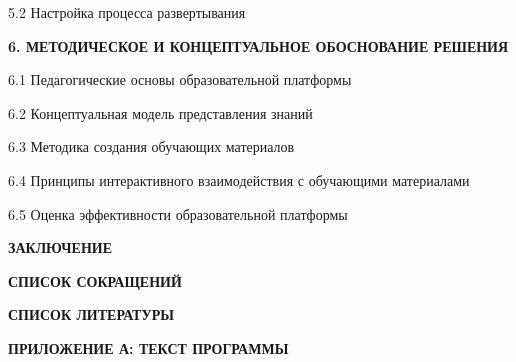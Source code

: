 {    \par 5.2 Настройка процесса развертывания 
    \par {\bfseries 6. МЕТОДИЧЕСКОЕ И КОНЦЕПТУАЛЬНОЕ ОБОСНОВАНИЕ РЕШЕНИЯ }
    \par 6.1 Педагогические основы образовательной платформы 
    \par 6.2 Концептуальная модель представления знаний 
    \par 6.3 Методика создания обучающих материалов 
    \par 6.4 Принципы интерактивного взаимодействия с обучающими материалами 
    \par 6.5 Оценка эффективности образовательной платформы 
    \par {\bfseries ЗАКЛЮЧЕНИЕ } 
    \par {\bfseries СПИСОК СОКРАЩЕНИЙ } 
    \par {\bfseries СПИСОК ЛИТЕРАТУРЫ } 
    \par {\bfseries ПРИЛОЖЕНИЕ А: ТЕКСТ ПРОГРАММЫ} 
    \par 
}